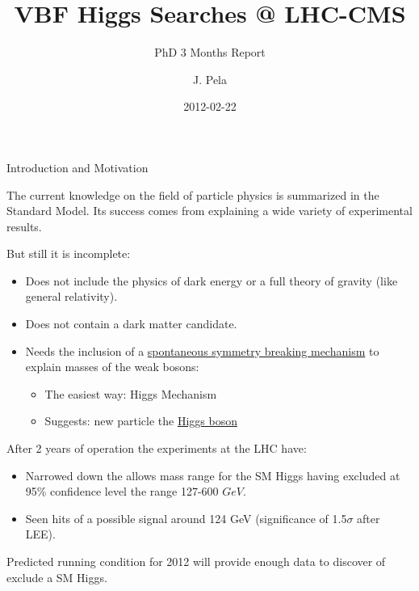 \documentclass[8pt]{beamer}
\author[João Pela]{J. Pela}
\title[VBF Higgs @ LHC-CMS]{VBF Higgs Searches @ LHC-CMS}
\subtitle{PhD 3 Months Report}
\institute{Imperial College London}
\date{2012-02-22}
\begin{document}
\setlength{\unitlength}{1mm}

\begin{frame}
  \titlepage
\end{frame}

\begin{frame}{Introduction and Motivation}

  The current knowledge on the field of particle physics is summarized in the Standard Model. Its success comes 
  from explaining a wide variety of experimental results.

  \begin{block}{But still it is incomplete:}

  \begin{itemize}  
    \item Does not include the physics of dark energy or a full theory of gravity (like general relativity).
    \item Does not contain a dark matter candidate.
    \item Needs the inclusion of a \uline{spontaneous symmetry breaking mechanism} to explain masses of the weak bosons:
    \begin{itemize}
      \item The easiest way: Higgs Mechanism
      \item Suggests: new particle the \uline{Higgs boson}
    \end{itemize}
  \end{itemize}

  \end{block}

  \begin{block}{After 2 years of operation the experiments at the LHC have:}

\begin{itemize}
  \item Narrowed down the allows mass range for the SM Higgs having excluded at 95\% confidence level the range 127-600 $GeV$. 
  \item Seen hits of a possible signal around 124 GeV (significance of 1.5$\sigma$ after LEE).
\end{itemize}

  \end{block}  

Predicted running condition for 2012 will provide enough data to discover of exclude a SM Higgs.

\end{frame}
\end{document}
